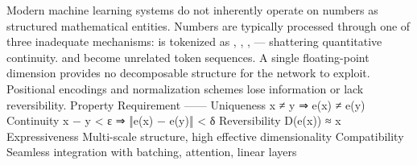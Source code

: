 \markdownRendererUlEndTight \markdownRendererInterblockSeparator
{}\markdownRendererThematicBreak{}\markdownRendererInterblockSeparator
{}
\markdownRendererSectionEnd \markdownRendererSectionBegin
{}\markdownRendererInterblockSeparator
{}\markdownRendererSectionBegin
{}\markdownRendererInterblockSeparator
{}Modern machine learning systems do not inherently operate on numbers as structured mathematical entities. Numbers are typically processed through one of three inadequate mechanisms:\markdownRendererInterblockSeparator
{}\markdownRendererUlBeginTight
\markdownRendererUlItem {}  is tokenized as , , ,  — shattering quantitative continuity.  and  become unrelated token sequences.\markdownRendererUlItemEnd 
\markdownRendererUlItem {} A single floating-point dimension provides no decomposable structure for the network to exploit.\markdownRendererUlItemEnd 
\markdownRendererUlItem {} Positional encodings and normalization schemes lose information or lack reversibility.\markdownRendererUlItemEnd 
\markdownRendererUlEndTight \markdownRendererInterblockSeparator
{}
\markdownRendererSectionEnd \markdownRendererSectionBegin
{}\markdownRendererInterblockSeparator
{}\markdownRendererPipe{} Property \markdownRendererPipe{} Requirement \markdownRendererPipe{}\markdownRendererSoftLineBreak
{}\markdownRendererPipe{}---\markdownRendererPipe{}---\markdownRendererPipe{}\markdownRendererSoftLineBreak
{}\markdownRendererPipe{} Uniqueness \markdownRendererPipe{} x ≠ y ⇒ e(x) ≠ e(y) \markdownRendererPipe{}\markdownRendererSoftLineBreak
{}\markdownRendererPipe{} Continuity \markdownRendererPipe{} \markdownRendererPipe{}x − y\markdownRendererPipe{} < ε ⇒ ‖e(x) − e(y)‖ < δ \markdownRendererPipe{}\markdownRendererSoftLineBreak
{}\markdownRendererPipe{} Reversibility \markdownRendererPipe{} D(e(x)) ≈ x \markdownRendererPipe{}\markdownRendererSoftLineBreak
{}\markdownRendererPipe{} Expressiveness \markdownRendererPipe{} Multi-scale structure, high effective dimensionality \markdownRendererPipe{}\markdownRendererSoftLineBreak
{}\markdownRendererPipe{} Compatibility \markdownRendererPipe{} Seamless integration with batching, attention, linear layers \markdownRendererPipe{}\markdownRendererInterblockSeparator
